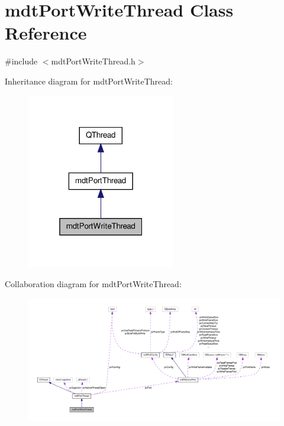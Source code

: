 \hypertarget{classmdt_port_write_thread}{\section{mdt\-Port\-Write\-Thread Class Reference}
\label{classmdt_port_write_thread}
}


{\ttfamily \#include $<$mdt\-Port\-Write\-Thread.\-h$>$}



Inheritance diagram for mdt\-Port\-Write\-Thread\-:
\nopagebreak
\begin{figure}[H]
\begin{center}
\leavevmode
\includegraphics[width=184pt]{classmdt_port_write_thread__inherit__graph}
\end{center}
\end{figure}


Collaboration diagram for mdt\-Port\-Write\-Thread\-:
\nopagebreak
\begin{figure}[H]
\begin{center}
\leavevmode
\includegraphics[width=350pt]{classmdt_port_write_thread__coll__graph}
\end{center}
\end{figure}
